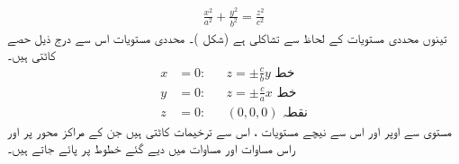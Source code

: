 \begin{align}\label{مساوات_سمتیہ_ترخیمی_مخروط}
\frac{x^2}{a^2}+\frac{y^2}{b^2}=\frac{z^2}{c^2}
\end{align}
تینوں محددی مستویات کے لحاظ سے تشاکلی ہے (شکل )۔ محددی مستویات اس سے درج ذیل حصے کاٹتی  ہیں۔
\begin{align}
x&=0:&&z=\pm\frac{c}{b}y\,\,\text{خط}\label{مساوات_سمتیہ_ترخیمی_مخروط_الف}\\
y&=0:&&z=\pm \frac{c}{a}x\,\,\text{خط}\label{مساوات_سمتیہ_ترخیمی_مخروط_ب}\\
z&=0:&&(0,0,0)\,\,\text{نقطہ}\nonumber
\end{align}
مستوی  سے اوپر اور اس سے نیچے مستویات    ،   اس سے ترخیمات  کاٹتی ہیں جن کے مراکز محور  پر اور راس  مساوات  اور مساوات  میں دیے گئے خطوط  پر پائے  جاتے ہیں۔

